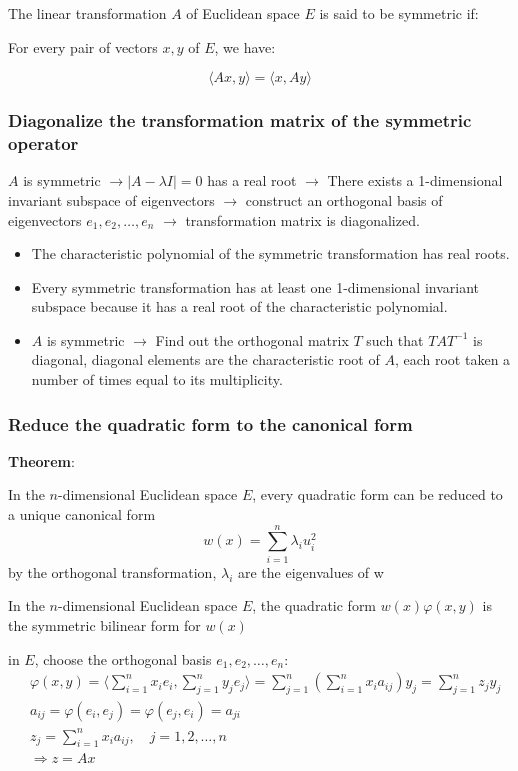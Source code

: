 The linear transformation $A$ of Euclidean space $E$ is said to be symmetric if:

For every pair of vectors $x, y$ of $E$, we have:

\[
\langle Ax, y \rangle = \langle x, Ay \rangle
\]

\subsubsection{Diagonalize the transformation matrix of the symmetric operator}

$A$ is symmetric $\rightarrow |A - \lambda I| = 0$ has a real root $\rightarrow$ There exists a 1-dimensional invariant subspace of eigenvectors $\rightarrow$ construct an orthogonal basis of eigenvectors $e_1, e_2, \dots, e_n$ $\rightarrow$ transformation matrix is diagonalized.
\begin{itemize}
    \item The characteristic polynomial of the symmetric transformation has real roots.
    \item Every symmetric transformation has at least one 1-dimensional invariant subspace because it has a real root of the characteristic polynomial.
    \item $A$ is symmetric $\rightarrow$ Find out the orthogonal matrix $T$ such that $TAT^{-1}$ is diagonal, diagonal elements are the characteristic root of $A$, each root taken a number of times equal to its multiplicity.
\end{itemize}

\subsubsection{Reduce the quadratic form to the canonical form}
\textbf{Theorem}:

In the $n$-dimensional Euclidean space $E$, every quadratic form can be reduced to a unique canonical form 
\[
w(x) = \sum_{i=1}^n \lambda_i u_i^2
\]
by the orthogonal transformation, $\lambda_i$ are the eigenvalues of w

In the $n$-dimensional Euclidean space $E$, the quadratic form $w(x)\varphi(x,y)$ is the symmetric bilinear form for $w(x)$

in $E$, choose the orthogonal basis $e_1, e_2, \ldots, e_n$:
\begin{align*}
    &\varphi(x, y) = \langle\sum_{i=1}^nx_ie_i, \sum_{j=1}^n  y_j e_j\rangle = \sum_{j=1}^n \left(\sum_{i=1}^n x_ia_{ij}\right)y_j = \sum_{j=1}^n z_j y_j\\
    &a_{ij} = \varphi(e_i, e_j) = \varphi(e_j, e_i) = a_{ji}\\
    &z_j = \sum_{i=1}^n x_i a_{ij}, \quad j = 1, 2, \ldots, n\\
    &\Rightarrow z = Ax
\end{align*}


